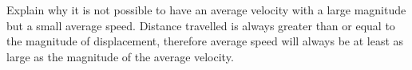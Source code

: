 {Explain why it is not possible to have an average velocity with a large magnitude but a small average speed.
}
{
Distance travelled is always greater than or equal to the magnitude of displacement, therefore average speed will always be at least as large as the magnitude of the average velocity.}